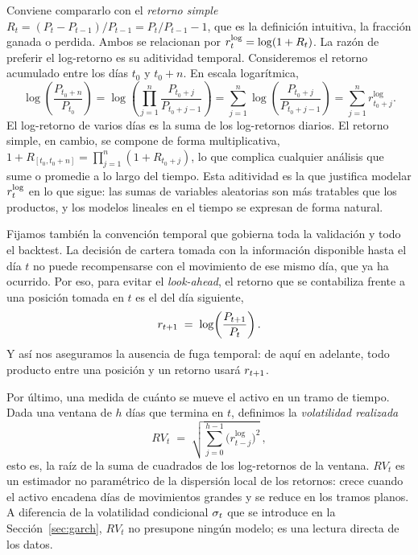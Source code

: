 Conviene compararlo con el \emph{retorno simple} $R_t = (P_t - P_{t-1})/P_{t-1} = P_t/P_{t-1} - 1$, que es la definición intuitiva, la fracción ganada o perdida. Ambos se relacionan por $r_t^{\log} = \log(1 + R_t)$. La razón de preferir el log-retorno es su aditividad temporal. Consideremos el retorno acumulado entre los días $t_0$ y $t_0 + n$. En escala logarítmica,
\[
\log\!\left(\frac{P_{t_0+n}}{P_{t_0}}\right)
= \log\!\left(\prod_{j=1}^{n} \frac{P_{t_0+j}}{P_{t_0+j-1}}\right)
= \sum_{j=1}^{n} \log\!\left(\frac{P_{t_0+j}}{P_{t_0+j-1}}\right)
= \sum_{j=1}^{n} r^{\log}_{t_0+j}.
\]
El log-retorno de varios días es la suma de los log-retornos diarios. El retorno simple, en cambio, se compone de forma multiplicativa, $1 + R_{[t_0, t_0+n]} = \prod_{j=1}^{n}(1 + R_{t_0+j})$, lo que complica cualquier análisis que sume o promedie a lo largo del tiempo. Esta aditividad es la que justifica modelar $r_t^{\log}$ en lo que sigue: las sumas de variables aleatorias son más tratables que los productos, y los modelos lineales en el tiempo se expresan de forma natural.

Fijamos también la convención temporal que gobierna toda la validación y todo el backtest. La decisión de cartera tomada con la información disponible hasta el día $t$ no puede recompensarse con el movimiento de ese mismo día, que ya ha ocurrido. Por eso, para evitar el \emph{look-ahead}, el retorno que se contabiliza frente a una posición tomada en $t$ es el del día siguiente,
\[
r_{t+1} \;=\; \log\!\left(\frac{P_{t+1}}{P_t}\right).
\]
Y así nos aseguramos la ausencia de fuga temporal: de aquí en adelante, todo producto entre una posición y un retorno usará $r_{t+1}$.


Por último, una medida de cuánto se mueve el activo en un tramo de tiempo. Dada una ventana de $h$ días que termina en $t$, definimos la \emph{volatilidad realizada}
\[
RV_t \;=\; \sqrt{\sum_{j=0}^{h-1} \big(r^{\log}_{t-j}\big)^2}\,,
\]
esto es, la raíz de la suma de cuadrados de los log-retornos de la ventana. $RV_t$ es un estimador no paramétrico de la dispersión local de los retornos: crece cuando el activo encadena días de movimientos grandes y se reduce en los tramos planos. A diferencia de la volatilidad condicional $\sigma_t$ que se introduce en la Sección~\ref{sec:garch}, $RV_t$ no presupone ningún modelo; es una lectura directa de los datos.

